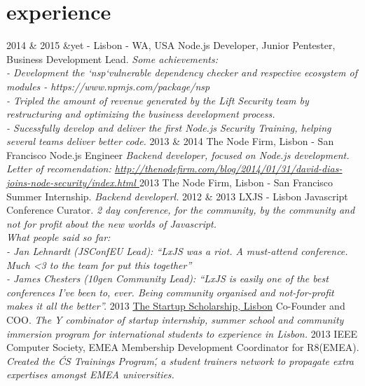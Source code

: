 \documentclass[]{friggeri-cv}
\begin{document}
\section{experience}

\begin{entrylist}
  \entry
    {2014 \& 2015}
    {\&yet - Lisbon -  WA, USA}
    {Node.js Developer, Junior Pentester, Business Development Lead.}
    {\emph{Some achievements:\\
        - Development the `nsp`vulnerable dependency checker and respective ecosystem of modules - https://www.npmjs.com/package/nsp\\
        - Tripled the amount of revenue generated by the Lift Security team by restructuring and optimizing the business development process.\\
        - Sucessfully develop and deliver the first Node.js Security Training, helping several teams deliver better code.}}
  \entry
    {2013 \& 2014}
    {The Node Firm, Lisbon - San Francisco}
    {Node.js Engineer}
    {\emph{Backend developer, focused on Node.js development. Letter of recomendation: \href{http://thenodefirm.com/blog/2014/01/31/david-dias-joins-node-security/index.html}{http://thenodefirm.com/blog/2014/01/31/david-dias-joins-node-security/index.html }}}
  \entry
    {2013}
    {The Node Firm, Lisbon - San Francisco}
    {Summer Internship.}
    {\emph{Backend developerl.}}
  \entry
    {2012 \& 2013}
    {LXJS - Lisbon Javascript Conference}
    {Curator.}
    {\emph{2 day conference, for the community, by the community and not for profit about the new worlds of Javascript.\\
    What people said so far: \\
      - Jan Lehnardt (JSConfEU Lead): “LxJS was a riot. A must-attend conference. Much <3 to the team for put this together”\\
      - James Chesters (10gen Community Lead): “LxJS is easily one of the best conferences I’ve been to, ever. Being community  organised and not-for-profit makes it all the better”.}}
  \entry
    {2013}
    {\href{http://startupscholarship.org/}{The Startup Scholarship, Lisbon}}
    {Co-Founder and COO.}
    {\emph{The Y combinator of startup internship, summer school and community immersion program for international students to experience in Lisbon.}}
  \entry
    {2013}
    {IEEE Computer Society, EMEA}
    {Membership Development Coordinator for R8(EMEA).}
    {\emph{Created the \'CS Trainings Program\', a student trainers network to propagate extra expertises amongst EMEA universities.}}    
\end{entrylist}
\end{document}
